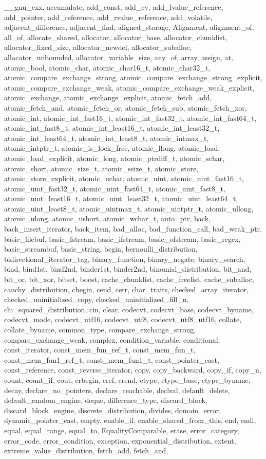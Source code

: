 {{\_\_gnu\_cxx, accumulate, add\_const, add\_cv, add\_lvalue\_reference, add\_pointer, add\_reference, add\_rvalue\_reference, add\_volatile, adjacent\_difference, adjacent\_find, aligned\_storage, Alignment, alignment\_of, all\_of, allocate\_shared, allocator, allocator\_base, allocator\_chunklist, allocator\_fixed\_size, allocator\_newdel, allocator\_suballoc, allocator\_unbounded, allocator\_variable\_size, any\_of, array, assign, at, atomic\_bool, atomic\_char, atomic\_char16\_t, atomic\_char32\_t, atomic\_compare\_exchange\_strong, atomic\_compare\_exchange\_strong\_explicit, atomic\_compare\_exchange\_weak, atomic\_compare\_exchange\_weak\_explicit, atomic\_exchange, atomic\_exchange\_explicit, atomic\_fetch\_add, atomic\_fetch\_and, atomic\_fetch\_or, atomic\_fetch\_sub, atomic\_fetch\_xor, atomic\_int, atomic\_int\_fast16\_t, atomic\_int\_fast32\_t, atomic\_int\_fast64\_t, atomic\_int\_fast8\_t, atomic\_int\_least16\_t, atomic\_int\_least32\_t, atomic\_int\_least64\_t, atomic\_int\_least8\_t, atomic\_intmax\_t, atomic\_intptr\_t, atomic\_is\_lock\_free, atomic\_llong, atomic\_load, atomic\_load\_explicit, atomic\_long, atomic\_ptrdiff\_t, atomic\_schar, atomic\_short, atomic\_size\_t, atomic\_ssize\_t, atomic\_store, atomic\_store\_explicit, atomic\_uchar, atomic\_uint, atomic\_uint\_fast16\_t, atomic\_uint\_fast32\_t, atomic\_uint\_fast64\_t, atomic\_uint\_fast8\_t, atomic\_uint\_least16\_t, atomic\_uint\_least32\_t, atomic\_uint\_least64\_t, atomic\_uint\_least8\_t, atomic\_uintmax\_t, atomic\_uintptr\_t, atomic\_ullong, atomic\_ulong, atomic\_ushort, atomic\_wchar\_t, auto\_ptr, back, back\_insert\_iterator, back\_item, bad\_alloc, bad\_function\_call, bad\_weak\_ptr, basic\_filebuf, basic\_fstream, basic\_ifstream, basic\_ofstream, basic\_regex, basic\_streambuf, basic\_string, begin, bernoulli\_distribution, bidirectional\_iterator\_tag, binary\_function, binary\_negate, binary\_search, bind, bind1st, bind2nd, binder1st, binder2nd, binomial\_distribution, bit\_and, bit\_or, bit\_xor, bitset, boost, cache\_chunklist, cache\_freelist, cache\_suballoc, cauchy\_distribution, cbegin, cend, cerr, char\_traits, checked\_array\_iterator, checked\_uninitialized\_copy, checked\_uninitialized\_fill\_n, chi\_squared\_distribution, cin, clear, codecvt, codecvt\_base, codecvt\_byname, codecvt\_mode, codecvt\_utf16, codecvt\_utf8, codecvt\_utf8\_utf16, collate, collate\_byname, common\_type, compare\_exchange\_strong, compare\_exchange\_weak, complex, condition\_variable, conditional, const\_iterator, const\_mem\_fun\_ref\_t, const\_mem\_fun\_t, const\_mem\_fun1\_ref\_t, const\_mem\_fun1\_t, const\_pointer\_cast, const\_reference, const\_reverse\_iterator, copy, copy\_backward, copy\_if, copy\_n, count, count\_if, cout, crbegin, cref, crend, ctype, ctype\_base, ctype\_byname, decay, declare\_no\_pointers, declare\_reachable, declval, default\_delete, default\_random\_engine, deque, difference\_type, discard\_block, discard\_block\_engine, discrete\_distribution, divides, domain\_error, dynamic\_pointer\_cast, empty, enable\_if, enable\_shared\_from\_this, end, endl, equal, equal\_range, equal\_to, EqualityComparable, erase, error\_category, error\_code, error\_condition, exception, exponential\_distribution, extent, extreme\_value\_distribution, fetch\_add, fetch\_and, }}
